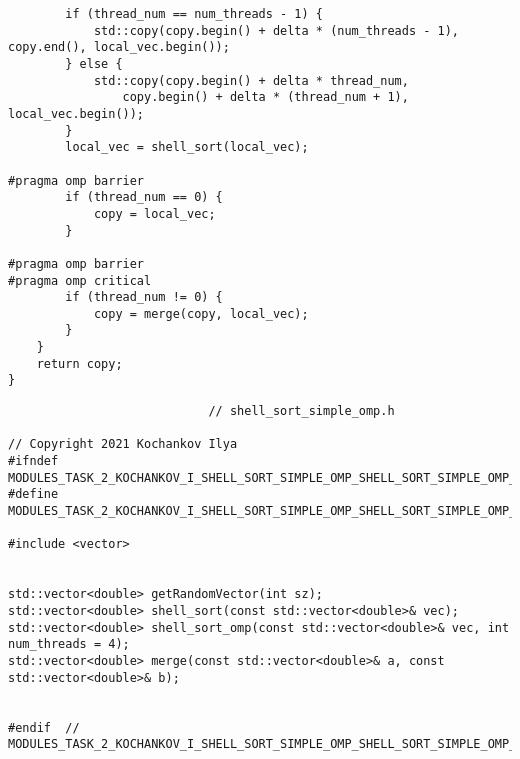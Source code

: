 \documentclass{report}
\begin{document}
\begin{lstlisting}
        if (thread_num == num_threads - 1) {
            std::copy(copy.begin() + delta * (num_threads - 1), copy.end(), local_vec.begin());
        } else {
            std::copy(copy.begin() + delta * thread_num,
                copy.begin() + delta * (thread_num + 1), local_vec.begin());
        }
        local_vec = shell_sort(local_vec);

#pragma omp barrier
        if (thread_num == 0) {
            copy = local_vec;
        }

#pragma omp barrier
#pragma omp critical
        if (thread_num != 0) {
            copy = merge(copy, local_vec);
        }
    }
    return copy;
}

\end{lstlisting}
\begin{lstlisting}
							// shell_sort_simple_omp.h

// Copyright 2021 Kochankov Ilya
#ifndef MODULES_TASK_2_KOCHANKOV_I_SHELL_SORT_SIMPLE_OMP_SHELL_SORT_SIMPLE_OMP_H_
#define MODULES_TASK_2_KOCHANKOV_I_SHELL_SORT_SIMPLE_OMP_SHELL_SORT_SIMPLE_OMP_H_

#include <vector>


std::vector<double> getRandomVector(int sz);
std::vector<double> shell_sort(const std::vector<double>& vec);
std::vector<double> shell_sort_omp(const std::vector<double>& vec, int num_threads = 4);
std::vector<double> merge(const std::vector<double>& a, const std::vector<double>& b);


#endif  // MODULES_TASK_2_KOCHANKOV_I_SHELL_SORT_SIMPLE_OMP_SHELL_SORT_SIMPLE_OMP_H_

\end{lstlisting}
\end{document}
